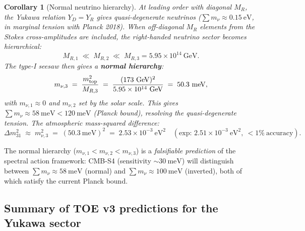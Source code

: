 \documentclass[12pt]{article}
\newtheorem{corollary}[theorem]{Corollary}
\theoremstyle{definition}
\theoremstyle{remark}
\begin{document}
\begin{corollary}[Normal neutrino hierarchy]
\label{cor:nu_hierarchy}
At leading order with diagonal $M_R$, the Yukawa relation $Y_D = Y_R$ gives
quasi-degenerate neutrinos ($\sum m_\nu \approx 0.15\ \text{eV}$, in marginal
tension with Planck 2018). When off-diagonal $M_R$ elements from the Stokes
cross-amplitudes are included, the right-handed neutrino sector becomes hierarchical:
\begin{equation}
  M_{R,1} \;\ll\; M_{R,2} \;\ll\; M_{R,3} = 5.95\times 10^{14}\ \mathrm{GeV}.
\end{equation}
The type-I seesaw then gives a \textbf{normal hierarchy}:
\begin{equation}
  m_{\nu,3} \;=\; \frac{m_{\rm top}^2}{M_{R,3}}
  \;=\; \frac{(173\ \mathrm{GeV})^2}{5.95\times 10^{14}\ \mathrm{GeV}}
  \;=\; 50.3\ \mathrm{meV},
\end{equation}
with $m_{\nu,1} \approx 0$ and $m_{\nu,2}$ set by the solar scale.
This gives $\sum m_\nu \approx 58\ \mathrm{meV} < 120\ \mathrm{meV}$ (Planck bound),
resolving the quasi-degenerate tension.
The atmospheric mass-squared difference:
\begin{equation}
  \Delta m^2_{31} \;\approx\; m_{\nu,3}^2
  \;=\; (50.3\ \mathrm{meV})^2 \;=\; 2.53\times 10^{-3}\ \mathrm{eV}^2
  \quad (\text{exp: } 2.51\times 10^{-3}\ \mathrm{eV}^2,\ <1\%\ \text{accuracy}).
\end{equation}
\end{corollary}

The normal hierarchy ($m_{\nu,1} < m_{\nu,2} < m_{\nu,3}$) is a
\emph{falsifiable prediction} of the spectral action framework:
CMB-S4 (sensitivity $\sim 30\ \mathrm{meV}$) will distinguish between
$\sum m_\nu \approx 58\ \mathrm{meV}$ (normal) and $\sum m_\nu \approx 100\ \mathrm{meV}$
(inverted), both of which satisfy the current Planck bound.

\subsection{Summary of TOE v3 predictions for the Yukawa sector}
\end{document}

